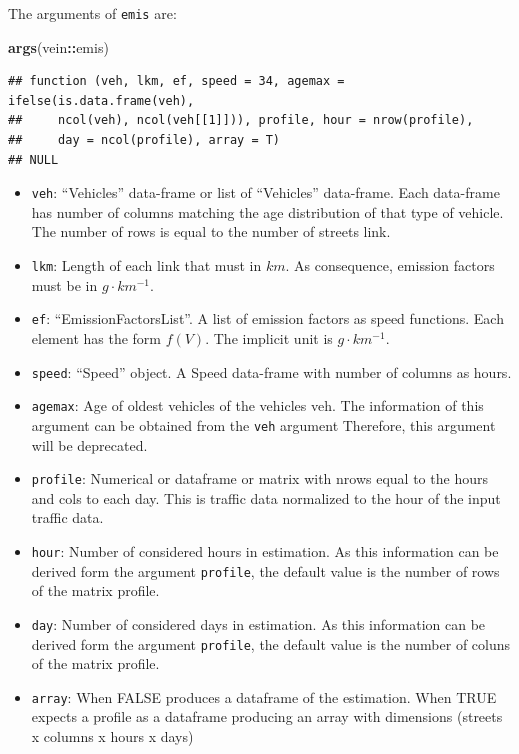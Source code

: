 \documentclass[12pt,graybox,envcountchap,sectrefs]{krantz}
\makeatletter
\newenvironment{Shaded}{\begin{snugshade}}{\end{snugshade}}
\newcommand{\KeywordTok}[1]{\textcolor[rgb]{0.13,0.29,0.53}{\textbf{#1}}}
\newcommand{\OperatorTok}[1]{\textcolor[rgb]{0.81,0.36,0.00}{\textbf{#1}}}
\newcommand{\NormalTok}[1]{#1}
\providecommand{\tightlist}{%
  \setlength{\itemsep}{0pt}\setlength{\parskip}{0pt}}
\newenvironment{kframe}{%
\medskip{}
\setlength{\fboxsep}{.8em}
 \def\at@end@of@kframe{}%
 \ifinner\ifhmode%
  \def\at@end@of@kframe{\end{minipage}}%
  \begin{minipage}{\columnwidth}%
 \fi\fi%
 \def\FrameCommand##1{\hskip\@totalleftmargin \hskip-\fboxsep
 \colorbox{shadecolor}{##1}\hskip-\fboxsep
     \hskip-\linewidth \hskip-\@totalleftmargin \hskip\columnwidth}%
 \MakeFramed {\advance\hsize-\width
   \@totalleftmargin\z@ \linewidth\hsize
   \@setminipage}}%
 {\par\unskip\endMakeFramed%
 \at@end@of@kframe}
\renewenvironment{Shaded}{\begin{kframe}}{\end{kframe}}
\theoremstyle{definition}
\theoremstyle{definition}
\theoremstyle{definition}
\theoremstyle{remark}
\makeatother
\begin{document}
The arguments of \texttt{emis} are:

\begin{Shaded}
\begin{Highlighting}[]
\KeywordTok{args}\NormalTok{(vein}\OperatorTok{::}\NormalTok{emis)}
\end{Highlighting}
\end{Shaded}

\begin{verbatim}
## function (veh, lkm, ef, speed = 34, agemax = ifelse(is.data.frame(veh), 
##     ncol(veh), ncol(veh[[1]])), profile, hour = nrow(profile), 
##     day = ncol(profile), array = T) 
## NULL
\end{verbatim}

\begin{itemize}
\tightlist
\item
  \texttt{veh}: ``Vehicles'' data-frame or list of ``Vehicles''
  data-frame. Each data-frame has number of columns matching the age
  distribution of that type of vehicle. The number of rows is equal to
  the number of streets link.
\item
  \texttt{lkm}: Length of each link that must in \(km\). As consequence,
  emission factors must be in \(g \cdot km^{-1}\).
\item
  \texttt{ef}: ``EmissionFactorsList''. A list of emission factors as
  speed functions. Each element has the form \(f(V)\). The implicit unit
  is \(g \cdot km^{-1}\).
\item
  \texttt{speed}: ``Speed'' object. A Speed data-frame with number of
  columns as hours.
\item
  \texttt{agemax}: Age of oldest vehicles of the vehicles veh. The
  information of this argument can be obtained from the \texttt{veh}
  argument Therefore, this argument will be deprecated.
\item
  \texttt{profile}: Numerical or dataframe or matrix with nrows equal to
  the hours and cols to each day. This is traffic data normalized to the
  hour of the input traffic data.
\item
  \texttt{hour}: Number of considered hours in estimation. As this
  information can be derived form the argument \texttt{profile}, the
  default value is the number of rows of the matrix profile.
\item
  \texttt{day}: Number of considered days in estimation. As this
  information can be derived form the argument \texttt{profile}, the
  default value is the number of coluns of the matrix profile.
\item
  \texttt{array}: When FALSE produces a dataframe of the estimation.
  When TRUE expects a profile as a dataframe producing an array with
  dimensions (streets x columns x hours x days)
\end{itemize}
\end{document}

